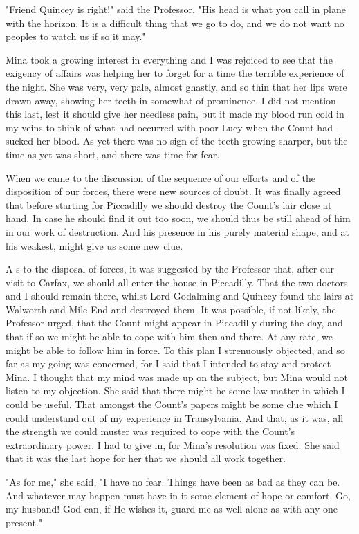 "Friend Quincey is right!" said the Professor. "His head is what you call in plane with the horizon. It is a difficult thing that we go to do, and we do not want no peoples to watch us if so it may." 

Mina took a growing interest in everything and I was rejoiced to see that the exigency of affairs was helping her to forget for a time the terrible experience of the night. She was very, very pale, almost ghastly, and so thin that her lips were drawn away, showing her teeth in somewhat of prominence. I did not mention this last, lest it should give her needless pain, but it made my blood run cold in my veins to think of what had occurred with poor Lucy when the Count had sucked her blood. As yet there was no sign of the teeth growing sharper, but the time as yet was short, and there was time for fear. 

When we came to the discussion of the sequence of our efforts and of the disposition of our forces, there were new sources of doubt. It was finally agreed that before starting for Piccadilly we should destroy the Count's lair close at hand. In case he should find it out too soon, we should thus be still ahead of him in our work of destruction. And his presence in his purely material shape, and at his weakest, might give us some new clue. 

A s to the disposal of forces, it was suggested by the Professor that, after our visit to Carfax, we should all enter the house in Piccadilly. That the two doctors and I should remain there, whilst Lord Godalming and Quincey found the lairs at Walworth and Mile End and destroyed them. It was possible, if not likely, the Professor urged, that the Count might appear in Piccadilly during the day, and that if so we might be able to cope with him then and there. At any rate, we might be able to follow him in force. To this plan I strenuously objected, and so far as my going was concerned, for I said that I intended to stay and protect Mina. I thought that my mind was made up on the subject, but Mina would not listen to my objection. She said that there might be some law matter in which I could be useful. That amongst the Count's papers might be some clue which I could understand out of my experience in Transylvania. And that, as it was, all the strength we could muster was required to cope with the Count's extraordinary power. I had to give in, for Mina's resolution was fixed. She said that it was the last hope for her that we should all work together. 

"As for me," she said, "I have no fear. Things have been as bad as they can be. And whatever may happen must have in it some element of hope or comfort. Go, my husband! God can, if He wishes it, guard me as well alone as with any one present." 

